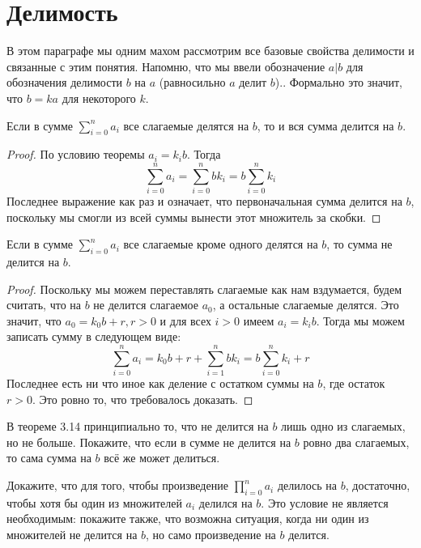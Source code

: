 \section{Делимость}

В этом параграфе мы одним махом рассмотрим все базовые свойства делимости и связанные с этим понятия. Напомню, что мы ввели обозначение $a|b$ для обозначения делимости $b$ на $a$ (равносильно $a$ делит $b$).. Формально это значит, что $b=ka$ для некоторого $k$.

\begin{thm}
Если в сумме $\sum_{i=0}^na_i$ все слагаемые делятся на $b$, то и вся сумма делится на $b$.
\end{thm}
\begin{proof}
По условию теоремы $a_i = k_i b$. Тогда
$$\sum_{i=0}^na_i = \sum_{i=0}^n bk_i = b\sum_{i=0}^n k_i$$
Последнее выражение как раз и означает, что первоначальная сумма делится на $b$, поскольку мы смогли из всей суммы вынести этот множитель за скобки.
\end{proof}

\begin{thm}
Если в сумме $\sum_{i=0}^na_i$ все слагаемые кроме одного делятся на $b$, то сумма не делится на $b$.
\end{thm}
\begin{proof}
Поскольку мы можем переставлять слагаемые как нам вздумается, будем считать, что на $b$ не делится слагаемое $a_0$, а остальные слагаемые делятся. Это значит, что $a_0 = k_0 b + r, r>0$ и для всех $i>0$ имеем $a_i=k_i b$. Тогда мы можем записать сумму в следующем виде:
$$\sum_{i=0}^na_i = k_0 b + r + \sum_{i=1}^n b k_i = b\sum_{i=0}^n k_i + r$$
Последнее есть ни что иное как деление с остатком суммы на $b$, где остаток $r>0$. Это ровно то, что требовалось доказать.
\end{proof}

\begin{exercise}
В теореме 3.14 принципиально то, что не делится на $b$ лишь одно из слагаемых, но не больше. Покажите, что если в сумме не делится на $b$ ровно два слагаемых, то сама сумма на $b$ всё же может делиться.
\end{exercise}

\begin{exercise}
Докажите, что для того, чтобы произведение $\prod_{i=0}^n a_i$ делилось на $b$, достаточно, чтобы хотя бы один из множителей $a_i$ делился на $b$. Это условие не является необходимым: покажите также, что возможна ситуация, когда ни один из множителей не делится на $b$, но само произведение на $b$ делится.
\end{exercise}

